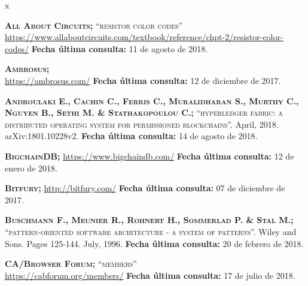 
\begin{thebibliography} {x}
	
	\pagestyle{empty}
	\thispagestyle{empty}

	\begingroup %
	\raggedright 
	\sloppy
	
	 \textsc{\textbf{All About Circuits; }}\textsc{“resistor color codes”} \\ 
	\url{https://www.allaboutcircuits.com/textbook/reference/chpt-2/resistor-color-codes/}
	\newline \textbf{Fecha última consulta:} 11 de agosto de 2018.
	
	 \textsc{\textbf{Ambrosus; }} \\
	\url{https://ambrosus.com/}
	\newline \textbf{Fecha última consulta:} 12 de diciembre de 2017.
	
	 \textsc{\textbf{Androulaki E., Cachin C., Ferris C., Muralidharan S., Murthy C., Nguyen B., Sethi M. \& Stathakopoulou C.; }}\textsc{“hyperledger fabric: a distributed operating system for permissioned blockchains”.} April, 2018. arXiv:1801.10228v2.
	\newline \textbf{Fecha última consulta:} 14 de agosto de 2018.
		
	 \textsc{\textbf{BigchainDB; }} 
	\url{https://www.bigchaindb.com/}
	\newline \textbf{Fecha última consulta:} 12 de enero de 2018.
			
	 \textsc{\textbf{Bitfury; }} 
	\url{http://bitfury.com/}
	\newline \textbf{Fecha última consulta:} 07 de diciembre de 2017.
			
	 \textsc{\textbf{Buschmann F., Meunier R., Rohnert H., Sommerlad P. \& Stal M.; }}\textsc{“pattern-oriented software architecture - a system of patterns”.} Wiley and Sons. Pages 125-144. July, 1996.
	\newline \textbf{Fecha última consulta:} 20 de febrero de 2018.
		
	 \textsc{\textbf{CA/Browser Forum; }}\textsc{“members”} \\ 
	\url{https://cabforum.org/members/}
	\newline \textbf{Fecha última consulta:} 17 de julio de 2018.
		

\end{thebibliography}

